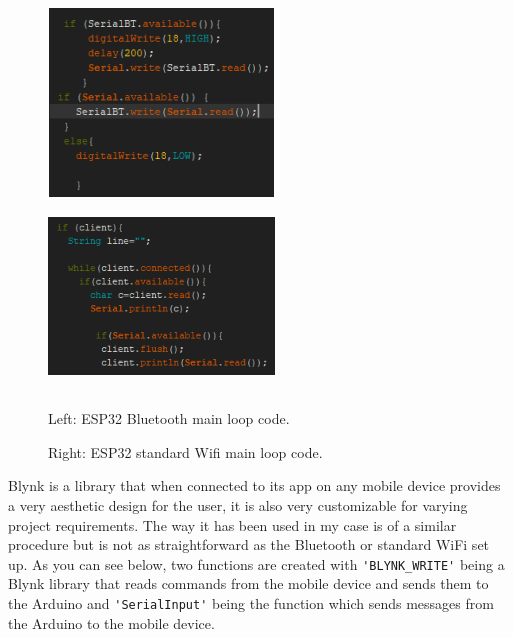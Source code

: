 \documentclass[8pt, a4paper]{article}
\begin{document}
\begin{figure}[H]
	\centering
	\includegraphics[height=5.0cm, width=6.0cm]{bluetooth}
	\includegraphics[height=5.0cm, width=6.0cm]{standard_wifi}
	\caption{Left: ESP32 Bluetooth main loop code.}
	\caption{Right: ESP32 standard Wifi main loop code.}
\end{figure}

Blynk is a library that when connected to its app on any mobile device provides a very aesthetic design for the user, it is also very customizable for varying project requirements.
The way it has been used in my case is of a similar procedure but is not as straightforward as the Bluetooth or standard WiFi set up. As you can see below, two functions are created with \verb|'BLYNK_WRITE'| being a Blynk library that reads commands from the mobile device and sends them to the Arduino and \verb|'SerialInput'| being the function which sends messages from the Arduino to the mobile device.
\end{document}
